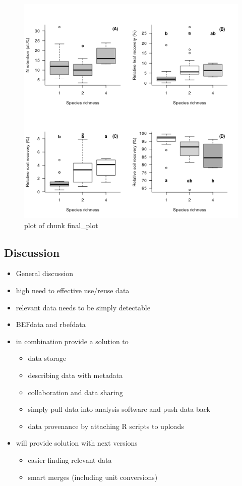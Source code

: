 \documentclass[]{article}
\makeatletter
\def\maxwidth{\ifdim\Gin@nat@width>\linewidth\linewidth
\else\Gin@nat@width\fi}
\let\Oldincludegraphics\includegraphics
\renewcommand{\includegraphics}[1]{\Oldincludegraphics[width=\maxwidth]{#1}}
\makeatother
\begin{document}
\begin{figure}[htbp]
\centering
\includegraphics{figure/final_plot.png}
\caption{plot of chunk final\_plot}
\end{figure}

\subsection{Discussion}

\begin{itemize}
\item
  General discussion
\item
  high need to effective use/reuse data
\item
  relevant data needs to be simply detectable
\item
  BEFdata and rbefdata
\item
  in combination provide a solution to

  \begin{itemize}
  \itemsep1pt\parskip0pt
  \item
    data storage
  \item
    describing data with metadata
  \item
    collaboration and data sharing
  \item
    simply pull data into analysis software and push data back
  \item
    data provenance by attaching R scripts to uploads
  \end{itemize}
\item
  will provide solution with next versions

  \begin{itemize}
  \itemsep1pt\parskip0pt
  \item
    easier finding relevant data
  \item
    smart merges (including unit conversions)
  \end{itemize}
\end{itemize}
\end{document}
